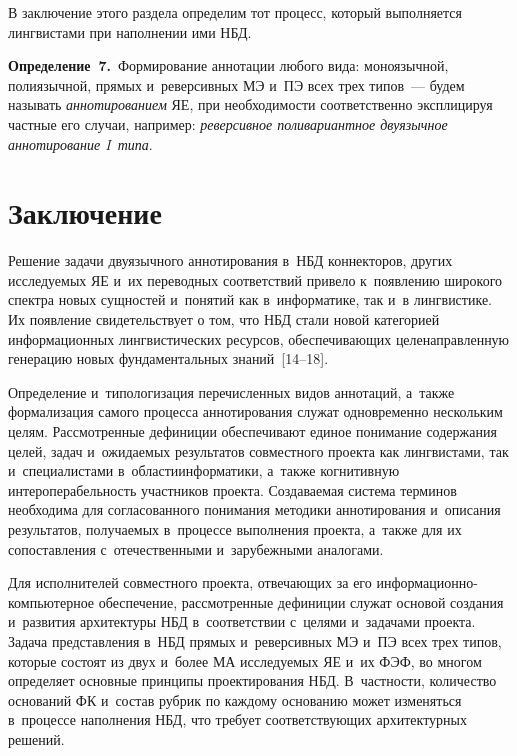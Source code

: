 \begin{multicols}{2}

В заключение этого раздела определим тот процесс, который выполняется 
лингвистами при наполнении ими НБД.
   
  
   
  \smallskip
   
   \noindent
   \textbf{Определение~7.}\ Формирование аннотации любого вида: 
моноязычной, полиязычной, прямых и~реверсивных МЭ и~ПЭ всех трех  
типов~--- будем называть \textit{аннотированием} ЯЕ, при необходимости 
соответственно эксплицируя частные его случаи, например: \textit{реверсивное 
поливариантное двуязычное аннотирование I~типа}.



\section{Заключение}

\vspace*{-24pt}
    
   Решение задачи двуязычного аннотирования в~НБД коннекторов, других 
исследуемых ЯЕ и~их  переводных соответствий привело к~появлению
широкого 
спектра новых сущностей и~понятий как  в~информатике, так и~в лингвистике. 
Их появление свидетельствует о том, что НБД стали новой категорией 
информационных лингвистических ресурсов, обеспечивающих 
целенаправленную генерацию новых фундаментальных знаний~[14--18].
   
   Определение и~типологизация перечисленных видов аннотаций, а~также 
формализация самого процесса аннотирования служат одновременно 
нескольким целям. Рассмотренные дефиниции обеспечивают единое понимание 
содержания целей, задач и~ожидаемых результатов совместного проекта как 
лингвистами, так и~специалистами в~области\linebreak информатики, а~так\-же 
когнитивную интероперабельность участников проекта. Создаваемая сис\-тема 
терминов необходима для согласованного понима\-ния методики аннотирования 
и~описания результатов, получаемых в~процессе выполнения проекта, а~также 
для их сопоставления с~отечественными и~зарубежными аналогами.
   
   Для исполнителей совместного проекта, отве\-чающих за его 
   ин\-фор\-ма\-ци\-он\-но-ком\-пью\-тер\-ное обеспечение, рассмотренные дефиниции 
   служат основой 
создания и~развития архитектуры НБД в~соответствии с~целями и~задачами 
проекта. Задача представления в~НБД прямых и~реверсивных МЭ и~ПЭ всех 
трех типов, которые состоят из двух и~более МА
исследуемых ЯЕ и~их ФЭФ, во многом определяет основные принципы 
проектирования НБД. В~частности, количество оснований ФК
и~состав рубрик по каждому основанию может изменяться 
в~процессе наполнения НБД, что требует соответствующих архитектурных 
решений.
   

\end{multicols}
